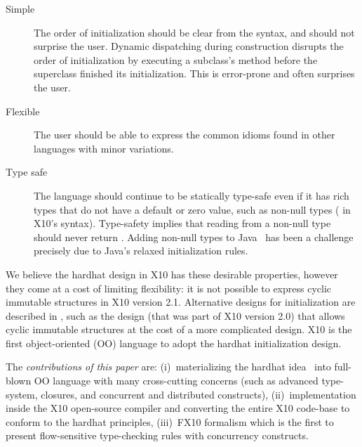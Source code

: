 \begin{description}

  \item[Simple]
    The order of initialization should be clear from the syntax, %
        and should not surprise the user.
    Dynamic dispatching during construction disrupts the order
        of initialization by executing a subclass's method before the superclass finished its initialization.
    This is error-prone and often surprises the user.

  \item[Flexible]
    The user should be able to express the common idioms
        found in other languages with minor variations.

  \item[Type safe]
    The language should continue to be statically type-safe even
        if it has rich types that do not have a default or zero value,
        such as non-null types ( in X10's syntax).
    Type-safety implies that reading from a non-null type should never return .
    Adding non-null types to Java~\cite{Fahndrich:2003:DCN:949305.949332,Fahndrich:2007:EOI:1297027.1297052,XinQi:2009}
        has been a challenge precisely due to
        Java's relaxed initialization rules.
\end{description}

We believe the hardhat design in X10 has these desirable properties,
    however they come at a cost of limiting flexibility:
    it is not possible to express cyclic immutable structures in X10 version 2.1.
Alternative designs for initialization are described in ,
    such as the  design (that was part of X10 version 2.0) that allows cyclic immutable structures
    at the cost of a more complicated design.
X10 is the first object-oriented (OO) language to adopt the hardhat initialization design.

The \emph{contributions of this paper} are:
    (i)~materializing the hardhat idea~\cite{Gil:2009:WRS:1615184.1615216}
        into %
        full-blown OO language with many cross-cutting concerns
        (such as advanced type-system, closures, and concurrent and distributed constructs),
    (ii)~implementation inside the X10 open-source compiler and
        converting the entire X10 code-base to conform to the hardhat principles,
    (iii)~FX10 formalism which is the first to present flow-sensitive type-checking rules with concurrency constructs.

